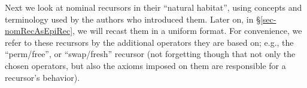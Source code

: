 %
Next we look at %
nominal recursors in their ``natural habitat'', using concepts and terminology used by the authors who introduced them. %
Later on, in \S\ref{sec-nomRecAsEpiRec}, we will recast them in a uniform format. 
%
%
%
For convenience, we %
refer to these recursors by the additional operators %
they are based on; e.g., the ``perm/free'', or ``swap/fresh'' recursor 
(not forgetting though that %
not only the chosen %
operators, but also %
the axioms imposed on 
them %
are %
responsible for a recursor's behavior).  %


